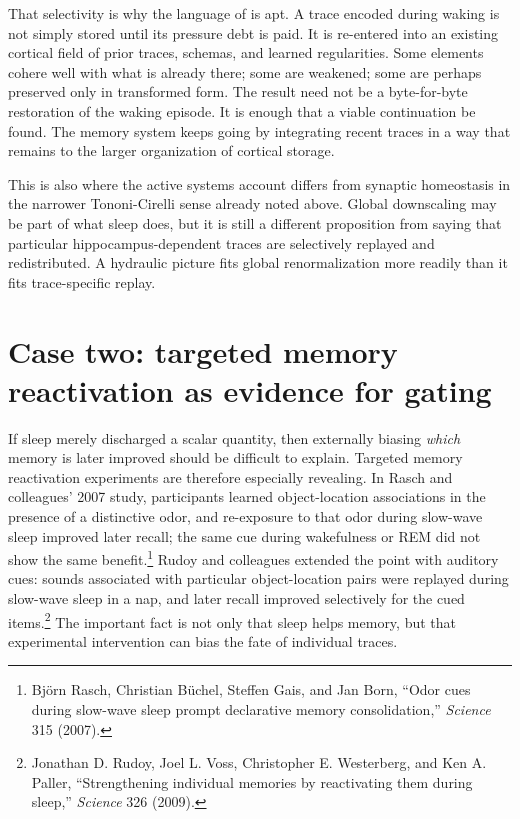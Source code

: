 \documentclass[11pt]{article}
\begin{document}
That selectivity is why the language of \repair is apt. A trace encoded during waking is not simply stored until its pressure debt is paid. It is re-entered into an existing cortical field of prior traces, schemas, and learned regularities. Some elements cohere well with what is already there; some are weakened; some are perhaps preserved only in transformed form. The result need not be a byte-for-byte restoration of the waking episode. It is enough that a viable continuation be found. The memory system keeps going by integrating recent traces in a way that remains \admissible to the larger organization of cortical storage.

This is also where the active systems account differs from synaptic homeostasis in the narrower Tononi-Cirelli sense already noted above. Global downscaling may be part of what sleep does, but it is still a different proposition from saying that particular hippocampus-dependent traces are selectively replayed and redistributed. A hydraulic picture fits global renormalization more readily than it fits trace-specific replay.

\section{Case two: targeted memory reactivation as evidence for gating}
If sleep merely discharged a scalar quantity, then externally biasing \emph{which} memory is later improved should be difficult to explain. Targeted memory reactivation experiments are therefore especially revealing. In Rasch and colleagues' 2007 study, participants learned object-location associations in the presence of a distinctive odor, and re-exposure to that odor during slow-wave sleep improved later recall; the same cue during wakefulness or REM did not show the same benefit.\footnote{Bj\"orn Rasch, Christian B\"uchel, Steffen Gais, and Jan Born, ``Odor cues during slow-wave sleep prompt declarative memory consolidation,'' \emph{Science} 315 (2007).} Rudoy and colleagues extended the point with auditory cues: sounds associated with particular object-location pairs were replayed during slow-wave sleep in a nap, and later recall improved selectively for the cued items.\footnote{Jonathan D. Rudoy, Joel L. Voss, Christopher E. Westerberg, and Ken A. Paller, ``Strengthening individual memories by reactivating them during sleep,'' \emph{Science} 326 (2009).} The important fact is not only that sleep helps memory, but that experimental intervention can bias the fate of individual traces.
\end{document}
